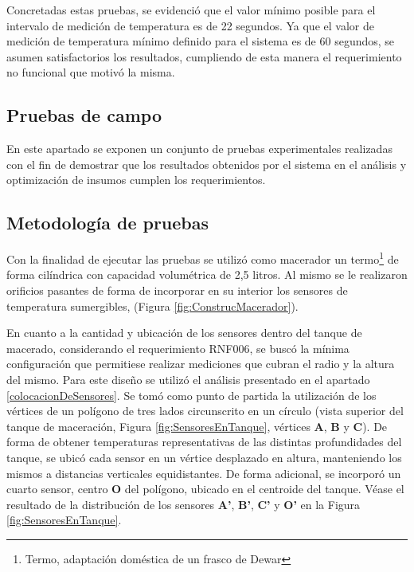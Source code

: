 \par
Concretadas estas pruebas, se evidenció que el valor mínimo posible para el intervalo de medición de temperatura es de 22 segundos. Ya que el valor de medición de temperatura mínimo definido para el sistema es de 60 segundos, se asumen satisfactorios los resultados, cumpliendo de esta manera el requerimiento no funcional que motivó la misma.

\subsection{Pruebas de campo}
\par En este apartado se exponen un conjunto de pruebas experimentales realizadas con el fin de demostrar que los resultados obtenidos por el sistema en el análisis y optimización de insumos cumplen los requerimientos. 

    \subsection{Metodología de pruebas}
        \par Con la finalidad de ejecutar las pruebas se utilizó como macerador un termo\footnote{Termo, adaptación doméstica de un frasco de Dewar} de forma cilíndrica con capacidad volumétrica de 2,5 litros. Al mismo se le realizaron orificios pasantes de forma de incorporar en su interior los sensores de temperatura sumergibles, (Figura \ref{fig:ConstrucMacerador}).
        
        \par En cuanto a la cantidad y ubicación de los sensores dentro del tanque de macerado, considerando el requerimiento RNF006, se buscó la mínima configuración que permitiese realizar mediciones que cubran el radio y la altura del mismo. Para este diseño se utilizó el análisis presentado en el apartado \ref{colocacionDeSensores}. Se tomó como punto de partida la utilización de los vértices de un polígono de tres lados circunscrito en un círculo (vista superior del tanque de maceración, Figura \ref{fig:SensoresEnTanque}, vértices \textbf{A}, \textbf{B} y \textbf{C}). De forma de obtener temperaturas representativas de las distintas profundidades del tanque, se ubicó cada sensor en un vértice desplazado en altura, manteniendo los mismos a distancias verticales equidistantes. De forma adicional, se incorporó un cuarto sensor, centro \textbf{O} del polígono, ubicado en el centroide del tanque. Véase el resultado de la distribución de los sensores \textbf{A'}, \textbf{B'}, \textbf{C'} y \textbf{O'} en la Figura \ref{fig:SensoresEnTanque}.

